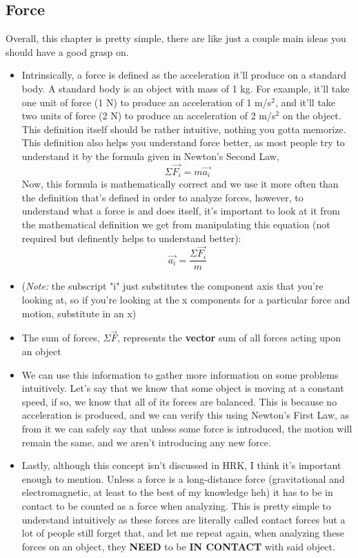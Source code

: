 \documentclass[openany]{book}
\begin{document}
\subsection{Force}
\quad Overall, this chapter is pretty simple, there are like just a couple main ideas you should have a good grasp on.
\begin{itemize}
    \item Intrinsically, a force is defined as the acceleration it'll produce on a standard body. A standard body is an object with mass of 1 kg. For example, it'll take one unit of force (1 N) to produce an acceleration of 1 m/s$^{2}$, and it'll take two units of force (2 N) to produce an acceleration of 2 m/s$^{2}$ on the object. This definition itself should be rather intuitive, nothing you gotta memorize. This definition also helps you understand force better, as most people try to understand it by the formula given in Newton's Second Law, \[\Sigma\vec{F_i} = m\vec{a_i}\] Now, this formula is mathematically correct and we use it more often than the definition that's defined in order to analyze forces, however, to understand what a force is and does itself, it's important to look at it from the mathematical definition we get from manipulating this equation (not required but definently helps to understand better): \[\vec{a_i} = \frac{\Sigma\vec{F_i}}{m}\]
    \item ({\textit{Note:}} the subscript "i" just substitutes the component axis that you're looking at, so if you're looking at the x components for a particular force and motion, substitute in an x)
    \item The sum of forces, $\Sigma\vec{F}$, represents the {\bfseries{vector}} sum of all forces acting upon an object
    \item We can use this information to gather more information on some problems intuitively. Let's say that we know that some object is moving at a constant speed, if so, we know that all of its forces are balanced. This is because no acceleration is produced, and we can verify this using Newton's First Law, as from it we can safely say that unless some force is introduced, the motion will remain the same, and we aren't introducing any new force.
    \item Lastly, although this concept isn't discussed in HRK, I think it's important enough to mention. Unless a force is a long-distance force (gravitational and electromagnetic, at least to the best of my knowledge heh) it has to be in contact to be counted as a force when analyzing. This is pretty simple to understand intuitively as these forces are literally called contact forces but a lot of people still forget that, and let me repeat again, when analyzing these forces on an object, they {\bfseries{NEED}} to be {\bfseries{IN CONTACT}} with said object.
\end{itemize}
\end{document}
